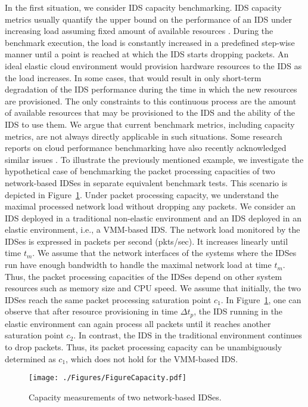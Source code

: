 In the first situation, we consider IDS capacity benchmarking. IDS capacity metrics usually quantify the upper bound on the performance of an IDS under increasing load assuming fixed amount of available resources \cite{hall:capacity}. During the benchmark execution, the load is constantly increased in a predefined step-wise manner until a point is reached at which the IDS starts dropping packets. An ideal elastic cloud environment would provision hardware resources to the IDS as the load increases. In some cases, that would result in only short-term degradation of the IDS performance during the time in which the new resources are provisioned. The only constraints to this continuous process are the amount of available resources that may be provisioned to the IDS and the ability of the IDS to use them. We argue that current benchmark metrics, including capacity metrics, are not always directly applicable in such situations. Some research reports on cloud performance benchmarking have also recently acknowledged similar issues \cite{binning:how}. To illustrate the previously mentioned example, we investigate the hypothetical case of benchmarking the packet processing capacities of two network-based IDSes in separate equivalent benchmark tests. This scenario is depicted in Figure~\ref{fig:idsCapacities}. Under packet processing capacity, we understand the maximal processed network load without dropping any packets.  We consider an IDS deployed in a traditional non-elastic environment and an IDS deployed in an elastic environment, i.e., a VMM-based IDS.  The network load monitored by the IDSes is expressed in packets per second (pkts/sec). It increases linearly until time $t_{m}$. We assume that the network interfaces of the systems where the IDSes run have enough bandwidth to handle the maximal network load at time $t_{m}$. Thus, the packet processing capacities of the IDSes depend on other system resources such as memory size and CPU speed.  We assume that initially, the two IDSes reach the same packet processing saturation point $c_{1}$. In Figure~\ref{fig:idsCapacities}, one can observe that after resource provisioning in time $\Delta t_{p}$, the IDS running in the elastic environment can again process all packets until it reaches another saturation point $c_{2}$. In contrast, the IDS in the traditional environment continues to drop packets. Thus, its packet processing capacity can be unambiguously determined as $c_{1}$, which does not hold for the VMM-based IDS.  

\begin{figure}
\centering
\texttt{[image: ./Figures/FigureCapacity.pdf]}
\caption{Capacity measurements of two network-based IDSes.}
\label{fig:idsCapacities}
\end{figure}


